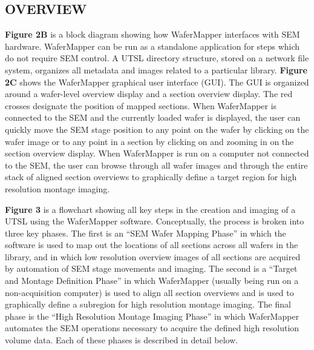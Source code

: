 \documentclass{article}
\begin{document}
\subsection*{OVERVIEW}

\textbf{Figure 2B} is a block diagram showing how WaferMapper interfaces with SEM hardware. WaferMapper can be run as a standalone application for steps which do not require SEM control. A UTSL directory structure, stored on a network file system, organizes all metadata and images related to a particular library. \textbf{Figure 2C} shows the WaferMapper graphical user interface (GUI). The GUI is organized around a wafer-level overview display and a section overview display. The red crosses designate the position of mapped sections. When WaferMapper is connected to the SEM and the currently loaded wafer is displayed, the user can quickly move the SEM stage position to any point on the wafer by clicking on the wafer image or to any point in a section by clicking on and zooming in on the section overview display. When WaferMapper is run on a computer not connected to the SEM, the user can browse through all wafer images and through the entire stack of aligned section overviews to graphically define a target region for high resolution montage imaging.

\textbf{Figure 3} is a flowchart showing all key steps in the creation and imaging of a UTSL using the WaferMapper software. Conceptually, the process is broken into three key phases. The first is an “SEM Wafer Mapping Phase” in which the software is used to map out the locations of all sections across all wafers in the library, and in which low resolution overview images of all sections are acquired by automation of SEM stage movements and imaging. The second is a “Target and Montage Definition Phase” in which WaferMapper (usually being run on a non-acquisition computer) is used to align all section overviews and is used to graphically define a subregion for high resolution montage imaging. The final phase is the “High Resolution Montage Imaging Phase” in which WaferMapper automates the SEM operations necessary to acquire
the defined high resolution volume data. Each of these phases is described in detail below.
\end{document}
